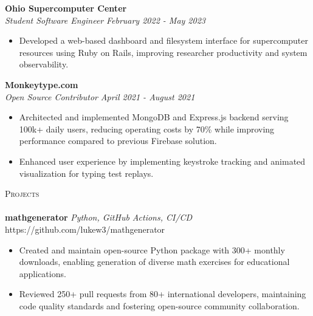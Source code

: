 \documentclass[letterpaper]{article}
\newcommand{\lineunder} {
    \vspace*{-8pt} \\
    \hspace*{-18pt} \hrulefill \\
}
\newcommand{\header} [1] {
    {\hspace*{-18pt}\vspace*{6pt} \textsc{#1}}
    \vspace*{-6pt} \lineunder
}
\begin{document}
    \textbf{Ohio Supercomputer Center}\\
    
    \textit{Student Software Engineer} \hfill \textsl{February 2022 - May 2023}\\
    \vspace{-7pt}
    \begin{itemize} \itemsep -1mm
        
            \item Developed a web-based dashboard and filesystem interface for supercomputer resources using Ruby on Rails, improving researcher productivity and system observability.

    \end{itemize}
    \vspace{-2mm}

    	\textbf{Monkeytype.com}\\
    
    \textit{Open Source Contributor} \hfill \textsl{April 2021 - August 2021}\\
    \vspace{-7pt}
    \begin{itemize} \itemsep -1mm
            \item Architected and implemented MongoDB and Express.js backend serving 100k+ daily users, reducing operating costs by 70\% while improving performance compared to previous Firebase solution.

            \item Enhanced user experience by implementing keystroke tracking and animated visualization for typing test replays.

    \end{itemize}
    \vspace{-2mm}

\header{Projects}

    {\textbf{mathgenerator}} {\sl Python, GitHub Actions, CI/CD} \hfill https://github.com/lukew3/mathgenerator\\
    \vspace{-2mm}
    \begin{itemize} \itemsep -1mm
    
        \item Created and maintain open-source Python package with 300+ monthly downloads, enabling generation of diverse math exercises for educational applications.

        \item Reviewed 250+ pull requests from 80+ international developers, maintaining code quality standards and fostering open-source community collaboration.

    \end{itemize}
    \vspace{-2mm}
\end{document}
